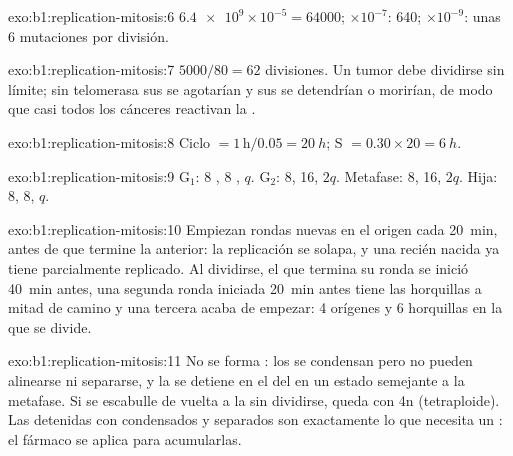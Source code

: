 \begin{solution}{exo:b1:replication-mitosis:6}
$\num{6.4e9}\times 10^{-5} = \num{64000}$; $\times 10^{-7}$: 640;
$\times 10^{-9}$: unas 6 mutaciones por división.
\end{solution}

\begin{solution}{exo:b1:replication-mitosis:7}
$5000/80 = 62$ divisiones. Un tumor debe dividirse sin límite; sin
telomerasa sus  se agotarían y sus  se detendrían o
morirían, de modo que casi todos los cánceres reactivan la .
\end{solution}

\begin{solution}{exo:b1:replication-mitosis:8}
Ciclo $= 1\,\mathrm{h}/0.05 = \qty{20}{h}$; S $= 0.30\times 20 =
\qty{6}{h}$.
\end{solution}

\begin{solution}{exo:b1:replication-mitosis:9}
G$_1$: 8 , 8 , $q$. G$_2$: 8, 16, $2q$. Metafase: 8, 16,
$2q$. Hija: 8, 8, $q$.
\end{solution}

\begin{solution}{exo:b1:replication-mitosis:10}
Empiezan rondas nuevas en el origen cada \qty{20}{min}, antes de que
termine la anterior: la replicación se solapa, y una  recién nacida ya
tiene  parcialmente replicado. Al dividirse, el  que termina su
ronda se inició \qty{40}{min} antes, una segunda ronda iniciada
\qty{20}{min} antes tiene las horquillas a mitad de camino y una tercera
acaba de empezar: 4 orígenes y 6 horquillas en la  que se divide.
\end{solution}

\begin{solution}{exo:b1:replication-mitosis:11}
No se forma : los  se condensan pero no pueden alinearse ni
separarse, y la  se detiene en el  del  en un
estado semejante a la metafase. Si se escabulle de vuelta a la  sin
dividirse, queda con 4n  (tetraploide). Las  detenidas con
 condensados y separados son exactamente lo que necesita un
: el fármaco se aplica para acumularlas.
\end{solution}

